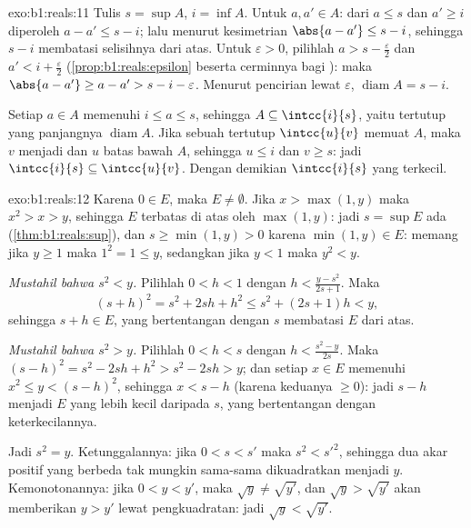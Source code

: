 \begin{solution}{exo:b1:reals:11}
Tulis $s = \sup A$, $i = \inf A$. Untuk $a, a' \in A$: dari $a \leq s$
dan $a' \geq i$ diperoleh $a - a' \leq s - i$; lalu menurut kesimetrian $\abs{a -
a'} \leq s - i$, sehingga $s - i$ membatasi  selisihnya dari atas. Untuk
$\varepsilon > 0$, pilihlah $a > s - \frac\varepsilon2$ dan $a' < i
+ \frac\varepsilon2$ (\cref{prop:b1:reals:epsilon} beserta cerminnya
bagi ): maka $\abs{a - a'} \geq a - a' > s - i -
\varepsilon$. Menurut pencirian lewat $\varepsilon$,
$\operatorname{diam} A = s - i$.

Setiap $a \in A$ memenuhi $i \leq a \leq s$, sehingga $A \subseteq
\intcc{i}{s}$, yaitu  tertutup yang panjangnya $\operatorname{diam}
A$. Jika sebuah  tertutup $\intcc{u}{v}$ memuat $A$, maka $v$ menjadi
 dan $u$ batas bawah $A$, sehingga $u \leq i$ dan $v
\geq s$: jadi $\intcc{i}{s} \subseteq \intcc{u}{v}$. Dengan demikian
$\intcc{i}{s}$ yang terkecil.
\end{solution}

\begin{solution}{exo:b1:reals:12}
Karena $0 \in E$, maka $E \neq \emptyset$. Jika $x > \max(1, y)$ maka $x^2 >
x > y$, sehingga $E$ terbatas di atas oleh $\max(1, y)$: jadi $s = \sup E$
ada (\cref{thm:b1:reals:sup}), dan $s \geq \min(1, y) > 0$
karena $\min(1, y) \in E$: memang jika $y \geq 1$ maka $1^2 = 1
\leq y$, sedangkan jika $y < 1$ maka $y^2 < y$.

\emph{Mustahil bahwa $s^2 < y$.} Pilihlah $0 < h < 1$ dengan $h <
\frac{y - s^2}{2s + 1}$. Maka
\[
(s + h)^2 = s^2 + 2sh + h^2 \leq s^2 + (2s + 1)h < y ,
\]
sehingga $s + h \in E$, yang bertentangan dengan $s$ membatasi $E$ dari atas.

\emph{Mustahil bahwa $s^2 > y$.} Pilihlah $0 < h < s$ dengan $h <
\frac{s^2 - y}{2s}$. Maka $(s - h)^2 = s^2 - 2sh + h^2 > s^2 -
2sh > y$; dan setiap $x \in E$ memenuhi $x^2 \leq y < (s - h)^2$,
sehingga $x < s - h$ (karena keduanya $\geq 0$): jadi $s - h$ menjadi 
$E$ yang lebih kecil daripada $s$, yang bertentangan dengan keterkecilannya.

Jadi $s^2 = y$. Ketunggalannya: jika $0 < s < s'$ maka $s^2 <
s'^2$, sehingga dua akar positif yang berbeda tak mungkin sama-sama dikuadratkan menjadi $y$.
Kemonotonannya: jika $0 < y < y'$, maka $\sqrt y \neq \sqrt{y'}$, dan
$\sqrt y > \sqrt{y'}$ akan memberikan $y > y'$ lewat pengkuadratan: jadi $\sqrt
y < \sqrt{y'}$.
\end{solution}

